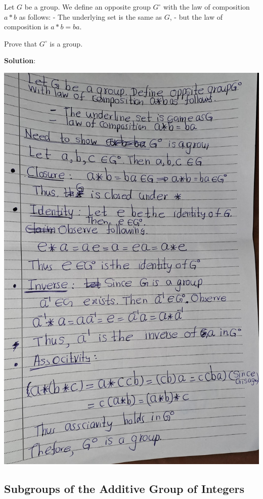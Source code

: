 \documentclass[
]{book}
\begin{document}
\leavevmode{}%
Let \(G\) be a group. We define an opposite group \(G^{\circ}\) with the
law of composition \(a * b\) as follows: - The underlying set is the
same as \(G\), - but the law of composition is \(a * b = ba\).

Prove that \(G^{\circ}\) is a group.

\textbf{Solution}:

\includegraphics{figures/ch_2/fig19.jpg}

\hypertarget{subgroups-of-the-additive-group-of-integers-1}{%
\subsection{Subgroups of the Additive Group of
Integers}\label{subgroups-of-the-additive-group-of-integers-1}}
\end{document}
